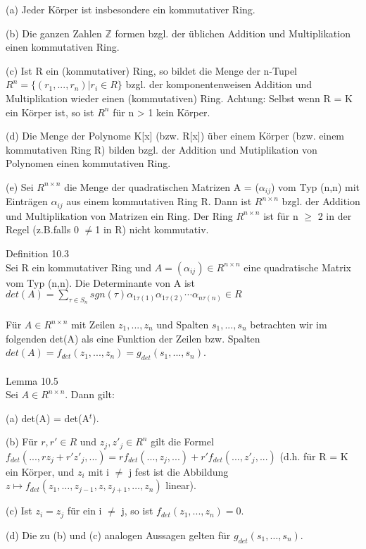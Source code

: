 \documentclass[fontsize=10pt]{scrartcl}
\begin{document}
\begin{compactenum}
\item[(a)] Jeder Körper ist insbesondere ein kommutativer Ring.
\item[(b)] Die ganzen Zahlen $\mathbb{Z}$ formen bzgl. der üblichen Addition und Multiplikation einen kommutativen Ring.
\item[(c)] Ist R ein (kommutativer) Ring, so bildet die Menge der n-Tupel $R^n = \{(r_1,..., r_n) | r_i \in R\}$ bzgl. der komponentenweisen Addition und Multiplikation wieder einen (kommutativen) Ring. Achtung: Selbst wenn R = K ein Körper ist, so ist $R^n$ für n > 1 kein Körper.
\item[(d)] Die Menge der Polynome K[x] (bzw. R[x]) über einem Körper (bzw. einem kommutativen Ring R) bilden bzgl. der Addition und Mutiplikation von Polynomen einen kommutativen Ring.
\item[(e)] Sei $R^{n \times n}$ die Menge der quadratischen Matrizen A = ($\alpha_{ij}$) vom Typ (n,n) mit Einträgen $\alpha_{ij}$ aus einem kommutativen Ring R. Dann ist $R^{n \times n}$ bzgl. der Addition und Multiplikation von Matrizen ein Ring. Der Ring $R^{n \times n}$ ist für n $\ge$ 2 in der Regel (z.B.falls 0 $\neq$1 in R) nicht kommutativ.\\
\end{compactenum}
Definition 10.3\\
Sei R ein kommutativer Ring und $A = (\alpha_{ij}) \in R^{n \times n}$ eine quadratische Matrix vom Typ (n,n). Die Determinante von A ist $det(A) = \sum\nolimits_{\tau \in S_n} sgn(\tau) \alpha_{1\tau(1)} \alpha_{1 \tau(2)} \cdots \alpha_{n \tau(n)} \in R$\\
\\
Für $A \in R^{n \times n}$ mit Zeilen $z_1, ..., z_n$ und Spalten $s_1, ..., s_n$ betrachten wir im folgenden det(A) als eine Funktion der Zeilen bzw. Spalten $det(A) = f_{det}(z_1,..., z_n) = g_{det}(s_1, ..., s_n)$.\\
\\
Lemma 10.5\\
Sei $A \in R^{n \times n}$. Dann gilt:
\begin{compactenum}
\item[(a)] det(A) = det(A$^t$).
\item[(b)] Für $r, r' \in R$ und $z_j,z'_j \in R^n$ gilt die Formel $f_{det}(...,rz_j + r'z'_j,...) = r f_{det}(...,z_j,...) + r' f_{det}(...,z'_j,...)$ (d.h. für R = K ein Körper, und $z_i$ mit i $\neq$ j fest ist die Abbildung $z \mapsto f_{det}(z_1,… , z_{j-1}, z, z_{j+1},… , z_n)$ linear). 
\item[(c)] Ist $z_i = z_j$ für ein i $\neq$ j, so ist $f_{det}(z_1, ..., z_n) = 0$.
\item[(d)] Die zu (b) und (c) analogen Aussagen gelten für $g_{det}(s_1, …, s_n)$.\\
\end{compactenum}
\end{document}
